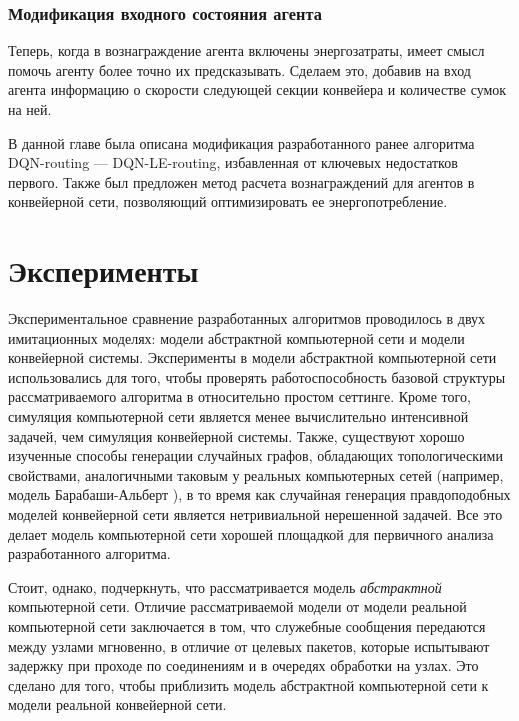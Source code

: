\documentclass[specification,annotation,times]{itmo-student-thesis}
\theoremstyle{definition}
\begin{document}
\subsection{Модификация входного состояния агента}

Теперь, когда в вознаграждение агента включены энергозатраты, имеет смысл помочь
агенту более точно их предсказывать. Сделаем это, добавив на вход агента
информацию о скорости следующей секции конвейера и количестве сумок на ней.

\chapterconclusion

В данной главе была описана модификация разработанного ранее алгоритма
DQN-routing --- DQN-LE-routing, избавленная от ключевых недостатков первого.
Также был предложен метод расчета вознаграждений для агентов в конвейерной сети,
позволяющий оптимизировать ее энергопотребление.

\chapter{Эксперименты}\label{experiments}

Экспериментальное сравнение разработанных алгоритмов проводилось в двух
имитационных моделях: модели абстрактной компьютерной сети и модели конвейерной
системы. Эксперименты в модели абстрактной компьютерной сети использовались для
того, чтобы проверять работоспособность базовой структуры рассматриваемого
алгоритма в относительно простом сеттинге. Кроме того, симуляция компьютерной
сети является менее вычислительно интенсивной задачей, чем симуляция конвейерной
системы. Также, существуют хорошо изученные способы генерации случайных графов,
обладающих топологическими свойствами, аналогичными таковым у реальных
компьютерных сетей (например, модель Барабаши-Альберт
\cite{albert2002statistical}), в то время как случайная генерация правдоподобных
моделей конвейерной сети является нетривиальной нерешенной задачей. Все это
делает модель компьютерной сети хорошей площадкой для первичного анализа
разработанного алгоритма.

Стоит, однако, подчеркнуть, что рассматривается модель \textit{абстрактной}
компьютерной сети. Отличие рассматриваемой модели от модели реальной
компьютерной сети заключается в том, что служебные сообщения передаются между
узлами мгновенно, в отличие от целевых пакетов, которые испытывают задержку при
проходе по соединениям и в очередях обработки на узлах. Это сделано для того,
чтобы приблизить модель абстрактной компьютерной сети к модели реальной
конвейерной сети.
\end{document}
